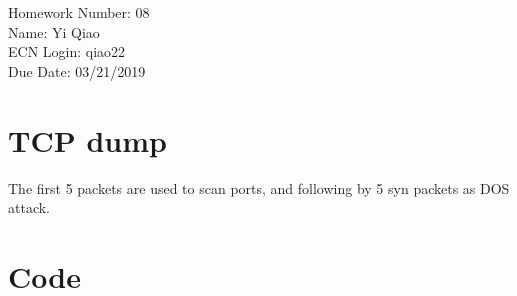 \documentclass[11pt]{article}
\begin{document}
\noindent Homework Number: 08\\
Name: Yi Qiao\\
ECN Login: qiao22\\
Due Date: 03/21/2019\\

\section*{TCP dump}

The first 5 packets are used to scan ports, and following by 5 syn packets as DOS attack.


\pagebreak
\section*{Code}
\inputminted[breaklines]{python}{TcpAttack.py}
\end{document}
